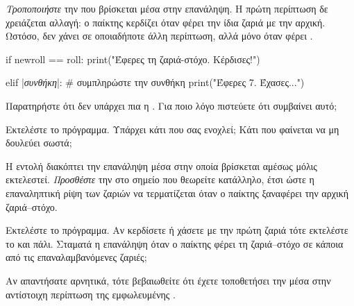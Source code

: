 \documentclass[a4paper,11pt,oneside]{book}
\begin{document}
\begin{step}



\end{step}

\begin{step}
\emph{Τροποποιήστε} την  που βρίσκεται μέσα στην επανάληψη. Η πρώτη περίπτωση δε χρειάζεται αλλαγή: ο παίκτης κερδίζει όταν φέρει την ίδια ζαριά με την αρχική. Ωστόσο, δεν χάνει σε οποιαδήποτε άλλη περίπτωση, αλλά μόνο όταν φέρει . 

\begin{pyplain}
        if newroll == roll:
            print("Έφερες τη ζαριά-στόχο. Κέρδισες!")
\end{pyplain}
\begin{pynew}
        elif |\textrm{\textit{συνθήκη}}|:   # συμπληρώστε την συνθήκη
            print("Έφερες 7. Έχασες...")
\end{pynew}

Παρατηρήστε ότι δεν υπάρχει πια η . Για ποιο λόγο πιστεύετε ότι συμβαίνει αυτό;

\marginnote[14pt]{\icondiscuss}
\dottedline

\dottedline

Εκτελέστε το πρόγραμμα. Υπάρχει κάτι που σας ενοχλεί; Κάτι που φαίνεται να μη δουλεύει σωστά;

\marginnote[14pt]{\icondiscuss}
\dottedline
\end{step}

\begin{step}
Η εντολή  διακόπτει την επανάληψη μέσα στην οποία βρίσκεται αμέσως μόλις εκτελεστεί. \emph{Προσθέστε} την  στο σημείο που θεωρείτε κατάλληλο, έτσι ώστε η επαναληπτική ρίψη των ζαριών να τερματίζεται όταν ο παίκτης ξαναφέρει την αρχική ζαριά--στόχο. 

Εκτελέστε το πρόγραμμα. Αν κερδίσετε ή χάσετε με την πρώτη ζαριά τότε εκτελέστε το και πάλι.
Σταματά η επανάληψη όταν ο παίκτης φέρει τη ζαριά--στόχο σε κάποια από τις επαναλαμβανόμενες ζαριές;

\marginnote[14pt]{\icondiscuss}
\dottedline

\begin{note}
Αν απαντήσατε αρνητικά, τότε βεβαιωθείτε ότι έχετε τοποθετήσει την  μέσα στην αντίστοιχη περίπτωση της εμφωλευμένης .
\end{note}
\end{step}
\end{document}
